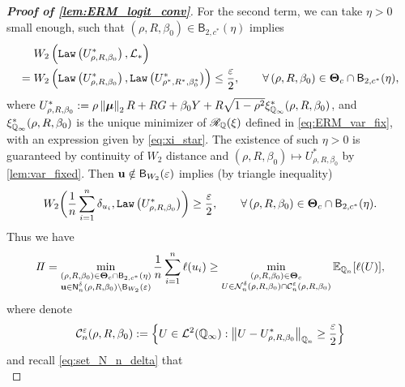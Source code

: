\begin{proof}[\textbf{Proof of \cref{lem:ERM_logit_conv}}]
For the second term, we can take $\eta > 0$ small enough, such that $(\rho, R, \beta_0) \in \mathsf{B}_{2,c^*}(\eta)$ implies
\begin{align*}
    &
    W_2 \, \Bigl( 
        \mathtt{Law} \left( U^*_{\rho, R, \beta_0} \right), \mathcal{L}_*
     \Bigr) \\
    = {} &  
    W_2 \, \Bigl(
        \mathtt{Law} \left( U^*_{\rho, R, \beta_0} \right), \mathtt{Law} \, \bigl( U^*_{\rho^*, R^*, \beta_0^*} \bigr)
     \Bigr)
     \le \frac{\varepsilon}{2},
     \qquad
     \forall\, (\rho, R, \beta_0) \in \text{\boldmath $\Theta$}_{c} \cap \mathsf{B}_{2,c^*}(\eta),
\end{align*}
where $U^*_{\rho, R, \beta_0} := \rho\left\|{{\boldsymbol{\mu}}}\right\|_2 R + RG + \beta_0 Y + R\sqrt{1 - \rho^2} \xi^*_{\mathbb{Q}_\infty}(\rho, R, \beta_0)$, and $\xi^*_{\mathbb{Q}_\infty}(\rho, R, \beta_0)$ is the unique minimizer of $\mathscr{R}_{\mathbb{Q}}(\xi)$ defined in \cref{eq:ERM_var_fix}, with an expression given by \cref{eq:xi_star}. The existence of such $\eta > 0$ is guaranteed by continuity of $W_2$ distance and $(\rho, R, \beta_0) \mapsto U^*_{\rho, R, \beta_0}$ by \cref{lem:var_fixed}. Then $\mathrm{\bf u} \notin \mathsf{B}_{W_2}(\varepsilon)$ implies (by triangle inequality)
\begin{equation*}
    W_2 \biggl( 
        \frac{1}{n}\sum_{i=1}^n \delta_{u_i}, \mathtt{Law} \left( U^*_{\rho, R, \beta_0} \right)
     \biggr)
     \ge \frac{\varepsilon}{2} 
     ,
     \qquad
     \forall\, (\rho, R, \beta_0) \in \text{\boldmath $\Theta$}_{c} \cap \mathsf{B}_{2,c^*}(\eta). 
\end{equation*} 
Thus we have
\begin{equation}
\label{eq:ERM_II0}
    I\!I = 
     \min_{ \substack{ (\rho, R, \beta_0) \in \text{\boldmath $\Theta$}_{c} \cap \mathsf{B}_{2,c^*}(\eta)
     \\ \mathrm{\bf u} \in 
    \mathsf{N}^\delta_n(\rho, R, \beta_0) \setminus \mathsf{B}_{W_2}(\varepsilon)  } } 
    \frac1n \sum_{i=1}^n \ell(u_i)
    \ge 
     \min_{ \substack{ (\rho, R, \beta_0) \in \text{\boldmath $\Theta$}_{c}
     \\ U \in 
    \mathcal{N}^\delta_n(\rho, R, \beta_0) \cap \mathcal{C}_n^\varepsilon(\rho, R, \beta_0)  } } 
    \mathbb{E}_{\mathbb{Q}_n}[\ell(U)],
\end{equation}
where denote
\begin{equation}
\label{eq:ERM_logit1}
    \mathcal{C}_n^\varepsilon(\rho, R, \beta_0) := \left\{ U \in \mathcal{L}^2(\mathbb{Q}_\infty): 
    \left\|{ U - U^*_{\rho, R, \beta_0} }\right\|_{\mathbb{Q}_n} \ge \frac{\varepsilon}{2}
    \right\}
\end{equation}
and recall \cref{eq:set_N_n_delta} that 
\begin{equation}

\end{equation}
\end{proof}
